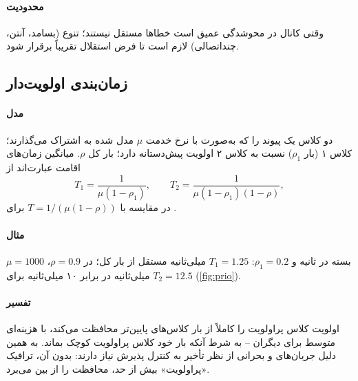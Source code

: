 \documentclass[11pt,a4paper]{article}
\begin{document}
\paragraph{محدودیت} وقتی کانال در محوشدگی عمیق است خطاها مستقل نیستند؛ تنوع (بسامد، آنتن، چنداتصالی) لازم است تا فرض استقلال تقریباً برقرار
شود.

\begin{acnfigure}
  \caption{نرخ خطای بستهٔ باقی‌مانده پس از $n$ ارسال (\cref{eq:harq}).}
  \label{fig:harq}
\end{acnfigure}

\subsection{زمان‌بندی اولویت‌دار}\label{sec:prio}
\paragraph{مدل} دو کلاس یک پیوند را که به‌صورت  با نرخ خدمت $\mu$ مدل شده به اشتراک می‌گذارند؛ کلاس ۱ (بار $\rho_1$) نسبت به کلاس ۲
اولویت پیش‌دستانه دارد؛ بار کل $\rho$. میانگین زمان‌های اقامت عبارت‌اند از
\begin{equation}\label{eq:prio}
  T_1 = \frac{1}{\mu(1-\rho_1)}, \qquad
  T_2 = \frac{1}{\mu(1-\rho_1)(1-\rho)},
\end{equation}
در مقایسه با $T = 1/(\mu(1-\rho))$ برای .
\paragraph{مثال} $\mu = 1000$ بسته در ثانیه و $\rho_1 = 0.2$: $T_1 = 1.25$ میلی‌ثانیه مستقل از بار کل؛ در $\rho = 0.9$، $T_2 = 12.5$ میلی‌ثانیه در
برابر ۱۰ میلی‌ثانیه برای  (\cref{fig:prio}).
\paragraph{تفسیر} اولویت کلاس پراولویت را کاملاً از بار کلاس‌های پایین‌تر محافظت می‌کند، با هزینه‌ای متوسط برای دیگران -- به شرط آنکه بار
خود کلاس پراولویت کوچک بماند. به همین دلیل جریان‌های  و بحرانی از نظر تأخیر به کنترل پذیرش نیاز دارند: بدون آن، ترافیک
«پراولویت» بیش از حد، محافظت را از بین می‌برد.

\begin{acnfigure}
  \caption{تأخیر میانگین با اولویت پیش‌دستانه و با  (\cref{eq:prio}، $\rho_1 = 0.2$، $\mu = 1000$\,s$^{-1}$).}
  \label{fig:prio}
\end{acnfigure}
\end{document}
